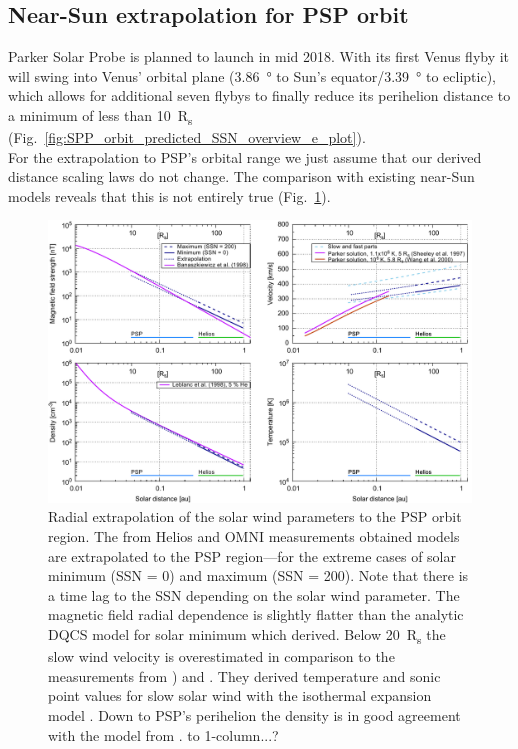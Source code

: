\subsection{Near-Sun extrapolation for PSP orbit}
Parker Solar Probe is planned to launch in mid 2018. With its first Venus flyby it will swing into Venus' orbital plane (\SI{3.86}{\degree} to Sun's equator/\SI{3.39}{\degree} to ecliptic), which allows for additional seven flybys to finally reduce its perihelion distance to a minimum of less than \SI{10}{R_s} \citep{Fox2015} (Fig.~\ref{fig:SPP_orbit_predicted_SSN_overview_e_plot}).\\

For the extrapolation to PSP's orbital range we just assume that our derived distance scaling laws do not change. The comparison with existing near-Sun models reveals that this is not entirely true (Fig.~\ref{fig:sw_extrapolation_ssn_b_plot}).\\
\begin{figure}
	\includegraphics[width=18cm]{figures/sw_extrapolation_ssn_b_plot.pdf}
	\caption{Radial extrapolation of the solar wind parameters to the PSP orbit region. The from Helios and OMNI measurements obtained models are extrapolated to the PSP region---for the extreme cases of solar minimum (SSN = 0) and maximum (SSN = 200). Note that there is a time lag to the SSN depending on the solar wind parameter. The magnetic field radial dependence is slightly flatter than the analytic DQCS model for solar minimum which \citet{Banaszkiewicz1998} derived. Below \SI{20}{R_s} the slow wind velocity is overestimated in comparison to the measurements from \citet{Wang2000}) and \citep{Sheeley1997}. They derived temperature and sonic point values for slow solar wind with the isothermal expansion model \citep{Parker1958}. Down to PSP's perihelion the density is in good agreement with the model from \citet{Leblanc1998}. to 1-column...?}
	\label{fig:sw_extrapolation_ssn_b_plot}
\end{figure}

